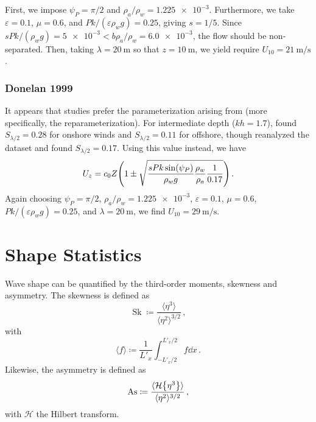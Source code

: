 \documentclass{jfm}
\let\Oldsection\section
\renewcommand{\section}{\FloatBarrier\Oldsection}
\let\Oldsubsubsection\subsubsection
\renewcommand{\subsubsection}{\FloatBarrier\Oldsubsubsection}
\DeclareMathOperator{\Sk}{Sk}
\DeclareMathOperator{\As}{As}
\newcommand{\hilbert}{\mathcal{H}}
\renewcommand*{\epsilon}{\varepsilon}
\begin{document}
First, we impose $\psi_P = \pi/2$ and $\rho_a/\rho_w = \num{1.225e-3}$.
Furthermore, we take $\epsilon = 0.1$, $\mu = 0.6$, and $P k/(\epsilon
\rho_w g) = 0.25$, giving $s=1/5$.
Since $s P k/(\rho_w g) = \num{5e-3} < b \rho_a/\rho_w = \num{6.0e-3}$,
the flow should be non-separated.
Then, taking $\lambda = \SI{20}{\meter}$ so that $z=\SI{10}{\meter}$, we
yield require $U_{10} = \SI{21}{\meter\per\second}$.

\subsubsection{Donelan 1999}
It appears that studies prefer the parameterization arising from
\citet{donelan1999wind} (more specifically, the reparameterization).
For intermediate depth ($kh = 1.7$), \citet{donelan1999wind} found
$S_{\lambda/2} = 0.28$ for onshore winds and $S_{\lambda/2} = 0.11$ for
offshore, though \citet{donelan2006wave} reanalyzed the dataset and
found $S_{\lambda/2} = 0.17$.
Using this value instead, we have
\begin{equation}
  U_z = c_0 Z \pqty{1 \pm \sqrt{\frac{s P k \sin(\psi_P)}{\rho_w g}
    \frac{\rho_w}{\rho_a} \frac{1}{0.17}}} \,.
\end{equation}
Again choosing $\psi_P = \pi/2$, $\rho_a/\rho_w = \num{1.225e-3}$,
$\epsilon = 0.1$, $\mu = 0.6$, $P k/(\epsilon \rho_w g) = 0.25$, and
$\lambda = \SI{20}{\meter}$, we find $U_{10} =
\SI{29}{\meter\per\second}$.

\section{Shape Statistics}
Wave shape can be quantified by the third-order moments, skewness and
asymmetry.
The skewness is defined as
\begin{equation}
  \Sk \coloneqq \frac{\langle \eta^3 \rangle}{\langle \eta^2
  \rangle^{3/2}} \,,
\end{equation}
with
\begin{equation}
  \langle f \rangle \coloneqq \frac{1}{L'_x} \int_{-L'_x/2}^{L'_x/2} f
  \dd{x} \,.
\end{equation}
Likewise, the asymmetry is defined as
\begin{equation}
  \As \coloneqq \frac{\langle \hilbert \Bqty{\eta^3} \rangle}{\langle
    \eta^2 \rangle^{3/2}} \,,
\end{equation}
with $\hilbert$ the Hilbert transform.
\end{document}
